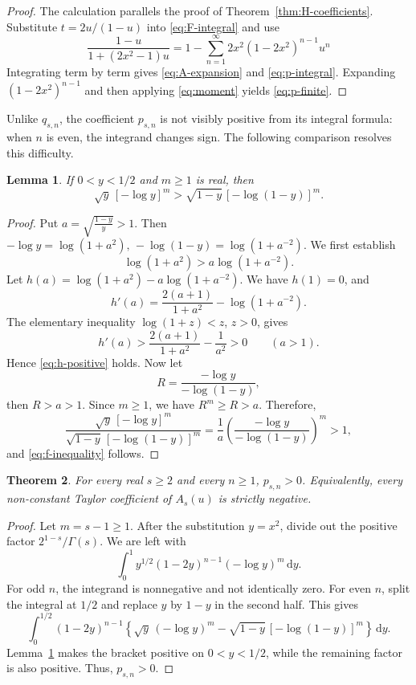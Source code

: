 \documentclass[11pt,reqno]{amsart}
\numberwithin{equation}{section}
\newtheorem{theorem}{Theorem}[section]
\newtheorem{lemma}[theorem]{Lemma}
\theoremstyle{definition}
\theoremstyle{remark}
\newcommand{\dd}{\,\mathrm{d}}
\begin{document}
\begin{proof}
The calculation parallels the proof of
Theorem~\ref{thm:H-coefficients}.  Substitute \(t=2u/(1-u)\) into
\eqref{eq:F-integral} and use
\[
 \frac{1-u}{1+(2x^2-1)u}
 =
 1-\sum_{n=1}^{\infty}
 2x^2(1-2x^2)^{n-1}u^n
\]
Integrating term by term gives \eqref{eq:A-expansion} and
\eqref{eq:p-integral}.  Expanding \((1-2x^2)^{n-1}\) and then applying
\eqref{eq:moment} yields \eqref{eq:p-finite}.
\end{proof}

Unlike \(q_{s,n}\), the coefficient \(p_{s,n}\) is not visibly
positive from its integral formula: when \(n\) is even, the integrand
changes sign.  The following comparison resolves this difficulty.

\begin{lemma}\label{lem:log-inequality}
If \(0<y<1/2\) and \(m\geq1\) is real, then
\begin{equation}\label{eq:f-inequality}
 \sqrt y\,[-\log y]^m
 >
 \sqrt{1-y}\,[-\log(1-y)]^m.
\end{equation}
\end{lemma}

\begin{proof}
Put
\(
 a=\sqrt{\frac{1-y}{y}}>1.
\)
Then
\(
 -\log y=\log(1+a^2),\,
 -\log(1-y)=\log(1+a^{-2}).
\)
We first establish
\begin{equation}\label{eq:h-positive}
 \log(1+a^2)>a\log(1+a^{-2}).
\end{equation}
Let
\(
 h(a)=\log(1+a^2)-a\log(1+a^{-2}).
\)
We have \(h(1)=0\), and
\[
 h'(a)
 =\frac{2(a+1)}{1+a^2}-\log(1+a^{-2}).
\]
The elementary inequality \(\log(1+z)<z\), \(z>0\), gives
\[
 h'(a)>
 \frac{2(a+1)}{1+a^2}-\frac1{a^2}>0
 \qquad(a>1).
\]
Hence \eqref{eq:h-positive} holds.  Now let
\[
 R=\frac{-\log y}{-\log(1-y)},
\]
then \(R>a>1\).  Since \(m\geq1\), we have \(R^m\geq R>a\).
Therefore,
\[
 \frac{\sqrt y\,[-\log y]^m}
 {\sqrt{1-y}\,[-\log(1-y)]^m}
 =\frac1a
 \left(\frac{-\log y}{-\log(1-y)}\right)^m>1,
\]
and \eqref{eq:f-inequality} follows.
\end{proof}

\begin{theorem}\label{thm:p-positive}
For every real \(s\geq2\) and every \(n\geq1\),
\( p_{s,n}>0\).
Equivalently, every non-constant Taylor coefficient of \(A_s(u)\) is
strictly negative.
\end{theorem}

\begin{proof}
Let \(m=s-1\geq1\).  After the substitution \(y=x^2\), divide out the positive factor
\(2^{1-s}/\Gamma(s)\).  We are left with
\begin{equation}\label{eq:p-y-integral}
 \int_0^1
 y^{1/2}(1-2y)^{n-1}(-\log y)^m\dd y.
\end{equation}
For odd \(n\), the integrand is nonnegative and not identically zero.
For even \(n\), split the integral at \(1/2\) and replace \(y\) by
\(1-y\) in the second half.  This gives
\[
 \int_0^{1/2}(1-2y)^{n-1}
 \left\{
 \sqrt y\,(-\log y)^m
 -\sqrt{1-y}\,[-\log(1-y)]^m
 \right\}\dd y.
\]
Lemma~\ref{lem:log-inequality} makes the bracket positive on
\(0<y<1/2\), while the remaining factor is also positive.  Thus,
\(p_{s,n}>0\).
\end{proof}
\end{document}
